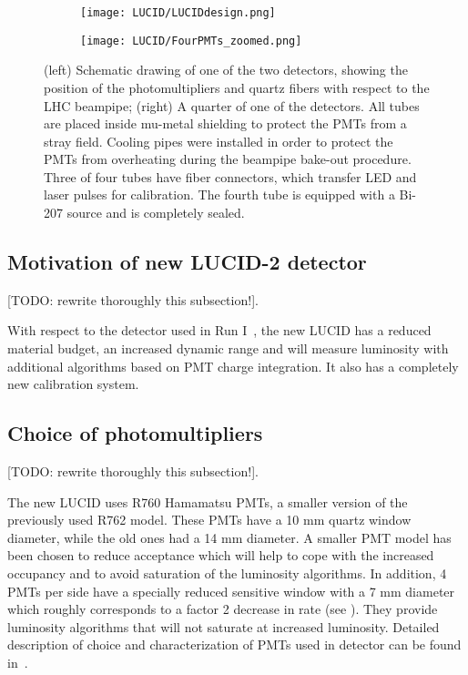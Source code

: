\begin{figure}
\centering
\begin{subfigure}{.5\textwidth}
  \centering
  \texttt{[image: LUCID/LUCIDdesign.png]}
\end{subfigure}%
\begin{subfigure}{.5\textwidth}
  \centering
  \texttt{[image: LUCID/FourPMTs\_zoomed.png]}
\end{subfigure}
\caption{(left) Schematic drawing of one of the two detectors, showing the position of the photomultipliers 
and quartz fibers with respect to the LHC beampipe; (right) A quarter of one of the detectors. All tubes are 
placed inside mu-metal shielding to protect the PMTs from a stray field. Cooling pipes were installed in order 
to protect the PMTs from overheating during the beampipe bake-out procedure. Three of four tubes have fiber connectors, which
transfer LED and laser pulses for calibration. The fourth tube is equipped with a Bi-207 source and is completely 
sealed.}
\label{fig:LucidDrawing}
\end{figure}


\subsection{Motivation of new LUCID-2 detector}
\label{subsec:motivationNewLucid}

[TODO: rewrite thoroughly this subsection!].

With respect to the detector used in Run I~\cite{Aad:2013ucp}, the new LUCID has a reduced material budget, 
an increased dynamic 
range and will measure luminosity with additional algorithms based on PMT charge integration. It also has a 
completely new calibration system.

\subsection{Choice of photomultipliers}
\label{subsec:PMTChoice}

[TODO: rewrite thoroughly this subsection!].

The new LUCID uses R760 Hamamatsu PMTs, a smaller version of the previously used R762 model. These PMTs have a 
10 mm quartz window diameter, while the old ones had a 14 mm diameter. A smaller PMT model has been chosen to reduce acceptance 
which will help to cope with the increased occupancy and to avoid saturation of the luminosity algorithms.
In addition, 4 PMTs per side have a specially reduced sensitive window with a 7 mm diameter which roughly 
corresponds to a factor 2 decrease in rate (see ). They provide luminosity algorithms that will not saturate at 
increased luminosity. Detailed description of choice and characterization of PMTs used in detector can be found in~\cite{Alberghi:2016tad}.

